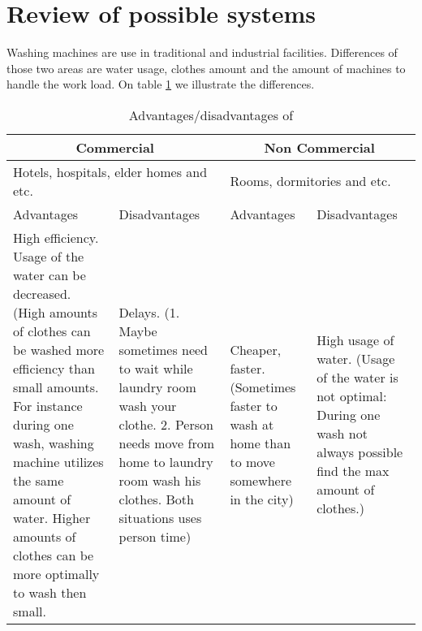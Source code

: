 \section{Review of possible systems}
Washing machines are use in traditional and industrial facilities. Differences of those two areas are water usage, clothes amount and the amount of machines to handle the work load. On table \ref{tab:AdDis} we illustrate the differences.

\begin{table}[h]
	\centering
    \begin{tabular}{ | p{3.5cm} | p{3.5cm} | p{3.5cm} | p{3.5cm} |}
    \hline
    \multicolumn{2}{|c|}{\textbf{Commercial}} & \multicolumn{2}{|c|}{\textbf{Non Commercial}} \\ \hline
    \multicolumn{2}{|l|}{Hotels, hospitals, elder homes and etc.} & \multicolumn{2}{|l|}{Rooms, dormitories and etc.} \\ \hline
    Advantages & Disadvantages & Advantages & Disadvantages \\ \hline
    High efficiency. Usage of the water can be decreased. (High amounts of clothes can be washed more efficiency than small amounts. For instance during one wash, washing machine utilizes the same amount of water. Higher amounts of clothes can be more optimally to wash then small. & Delays. (1. Maybe sometimes need to wait while laundry room wash your clothe. 2. Person needs move from home to laundry room wash his clothes. Both situations uses person time) & Cheaper, faster. (Sometimes faster to wash at home than to move somewhere in the city) & High usage of water. (Usage of the water is not optimal: During one wash not always possible find the max amount of clothes.) \\ \hline
    \end{tabular}
	\caption{Advantages/disadvantages of }
	\label{tab:AdDis}
\end{table}